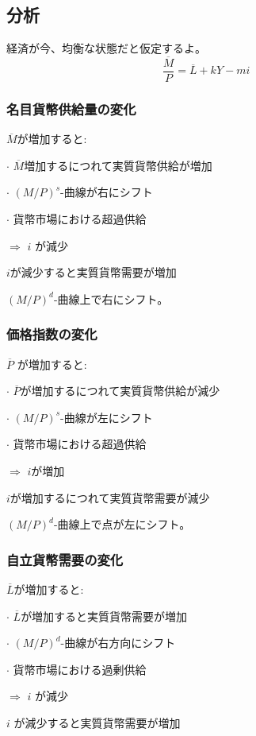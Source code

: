 \documentclass[a4paper, 12pt]{article}
\begin{document}
\subsection{分析}
経済が今、均衡な状態だと仮定するよ。
\begin{equation*}
\frac{\overline{M}}{P}=\overline{L}+kY-mi
\end{equation*}

\subsubsection{名目貨幣供給量の変化}
$\overline{M}$が増加すると:

\quad $\cdot$ $\overline{M}$増加するにつれて実質貨幣供給が増加

\qquad $\cdot$ $(M/P)^s$-曲線が右にシフト

\qquad $\cdot$ 貨幣市場における超過供給

\qquad $\Rightarrow$ $i$ が減少

\quad $i$が減少すると実質貨幣需要が増加

\qquad $(M/P)^d$-曲線上で右にシフト。

\subsubsection{価格指数の変化}
$\overline{P}$ が増加すると:

\quad $\cdot$ $\overline{P}$が増加するにつれて実質貨幣供給が減少

\qquad $\cdot$ $(M/P)^s$-曲線が左にシフト

\qquad $\cdot$ 貨幣市場における超過供給

\qquad $\Rightarrow$ $i$が増加

\quad $i$が増加するにつれて実質貨幣需要が減少

\qquad $(M/P)^d$-曲線上で点が左にシフト。

\subsubsection{自立貨幣需要の変化}
$\overline{L}$が増加すると:

\quad $\cdot$ $\overline{L}$が増加すると実質貨幣需要が増加

\qquad $\cdot$ $(M/P)^d$-曲線が右方向にシフト

\qquad $\cdot$ 貨幣市場における過剰供給

\qquad $\Rightarrow$ $i$ が減少

\quad $i$ が減少すると実質貨幣需要が増加
\end{document}
